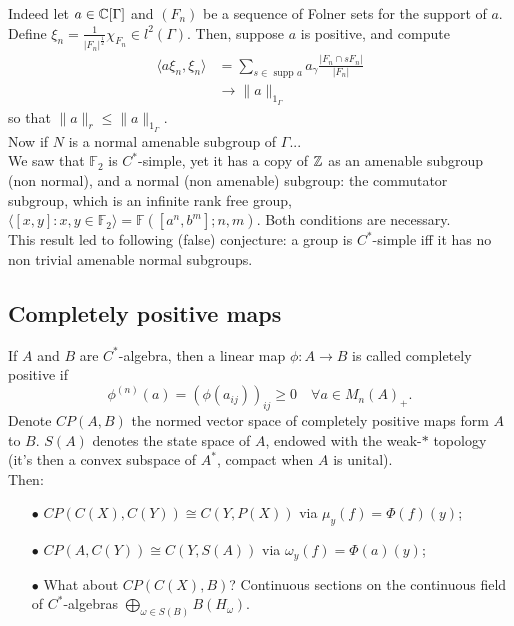 Indeed let $a\in \mathbb C [\Gamma]$ and $(F_n)$ be a sequence of Folner sets for the support of $a$. Define $\xi_n = \frac{1}{|F_n|^\frac{1}{2}} \chi_{F_n} \in l^2(\Gamma )$. Then, suppose $a$ is positive, and compute
\[\begin{split}
\langle a \xi_n , \xi_n \rangle & = \sum_{s\in \text{ supp }a} a_\gamma \frac{|F_n \cap sF_n|}{|F_n|} \\ 
				& \rightarrow \| a \|_{1_\Gamma}
\end{split}\]
so that $ \| a\|_r \leq \| a\|_{1_\Gamma} $.\\

Now if $N$ is a normal amenable subgroup of $\Gamma$...\\

We saw that $\mathbb F_2$ is $C^*$-simple, yet it has a copy of $\mathbb Z$ as an amenable subgroup (non normal), and a normal (non amenable) subgroup: the commutator subgroup, which is an infinite rank free group, $\langle [x,y ] : x,y \in \mathbb F_2\rangle = \mathbb F([a^n, b^m] ; n,m) $. Both conditions are necessary.\\

This result led to following (false) conjecture: a group is $C^*$-simple iff it has no non trivial amenable normal subgroups.\\

\subsection{Completely positive maps}

If $A$ and $B$ are $C^*$-algebra, then a linear map $\phi : A\rightarrow B$ is called completely positive if 
\[\phi^{(n)}(a) = (\phi(a_{ij}))_{ij} \geq 0 \quad \forall a \in M_n(A)_+.\]
Denote $CP(A,B)$ the normed vector space of completely positive maps form $A$ to $B$. $S(A)$ denotes the state space of $A$, endowed with the weak-$*$ topology (it's then a convex subspace of $A^*$, compact when $A$ is unital).\\

Then: \\
\begin{itemize}
\item[$\bullet$] $CP(C(X),C(Y)) \cong C(Y, P(X))$ via $\mu_y(f) = \Phi(f)(y)$; \\

\item[$\bullet$] $CP(A,C(Y)) \cong C(Y, S(A))$ via $\omega_y(f) = \Phi(a)(y)$;\\

\item[$\bullet$] What about $CP(C(X),B)$? Continuous sections on the continuous field of $C^*$-algebras $\bigoplus_{\omega\in S(B)} B(H_\omega)$.\\
\end{itemize}

